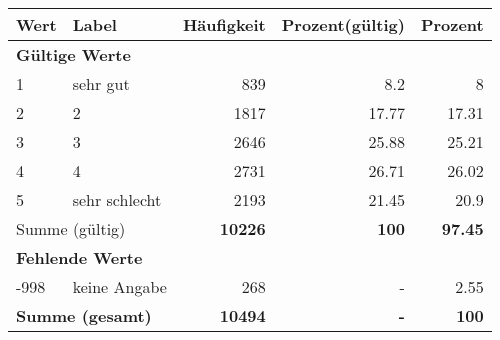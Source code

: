      \begin{longtable}{lXrrr}
     \toprule
     \textbf{Wert} & \textbf{Label} & \textbf{Häufigkeit} & \textbf{Prozent(gültig)} & \textbf{Prozent} \\
     \endhead
     \midrule
     \multicolumn{5}{l}{\textbf{Gültige Werte}}\\

     1 &
     \multicolumn{1}{X}{ sehr gut   } &


       \num{839} &
       \num[round-mode=places,round-precision=2]{8.2} &
         \num[round-mode=places,round-precision=2]{8} \\

     2 &
     \multicolumn{1}{X}{ 2   } &


       \num{1817} &
       \num[round-mode=places,round-precision=2]{17.77} &
         \num[round-mode=places,round-precision=2]{17.31} \\

     3 &
     \multicolumn{1}{X}{ 3   } &


       \num{2646} &
       \num[round-mode=places,round-precision=2]{25.88} &
         \num[round-mode=places,round-precision=2]{25.21} \\

     4 &
     \multicolumn{1}{X}{ 4   } &


       \num{2731} &
       \num[round-mode=places,round-precision=2]{26.71} &
         \num[round-mode=places,round-precision=2]{26.02} \\

     5 &
     \multicolumn{1}{X}{ sehr schlecht   } &


       \num{2193} &
       \num[round-mode=places,round-precision=2]{21.45} &
         \num[round-mode=places,round-precision=2]{20.9} \\
     \midrule
     \multicolumn{2}{l}{Summe (gültig)} &
       \textbf{\num{10226}} &
     \textbf{\num{100}} &
       \textbf{\num[round-mode=places,round-precision=2]{97.45}} \\
     \multicolumn{5}{l}{\textbf{Fehlende Werte}}\\
       -998 &
       keine Angabe &
         \num{268} &
        - &
         \num[round-mode=places,round-precision=2]{2.55} \\
     \midrule
     \multicolumn{2}{l}{\textbf{Summe (gesamt)}} &
          \textbf{\num{10494}} &
        \textbf{-} &
        \textbf{\num{100}} \\
     \bottomrule
     \end{longtable}
     
